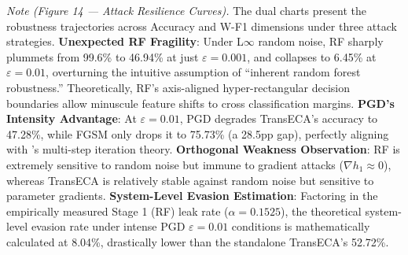 \documentclass[sigconf]{acmart}
\begin{document}
\begin{center}
\end{center}

\textit{Note (Figure 14 --- Attack Resilience Curves).} The dual charts present the robustness trajectories across Accuracy and W-F1 dimensions under three attack strategies. \textbf{Unexpected RF Fragility}: Under L$\infty$ random noise, RF sharply plummets from 99.6\% to 46.94\% at just $\varepsilon=0.001$, and collapses to 6.45\% at $\varepsilon=0.01$, overturning the intuitive assumption of ``inherent random forest robustness.'' Theoretically, RF's axis-aligned hyper-rectangular decision boundaries allow minuscule feature shifts to cross classification margins. \textbf{PGD's Intensity Advantage}: At $\varepsilon=0.01$, PGD degrades TransECA's accuracy to 47.28\%, while FGSM only drops it to 75.73\% (a 28.5pp gap), perfectly aligning with \cite{13}'s multi-step iteration theory. \textbf{Orthogonal Weakness Observation}: RF is extremely sensitive to random noise but immune to gradient attacks ($\nabla h_1 \approx 0$), whereas TransECA is relatively stable against random noise but sensitive to parameter gradients. \textbf{System-Level Evasion Estimation}: Factoring in the empirically measured Stage 1 (RF) leak rate ($\alpha=0.1525$), the theoretical system-level evasion rate under intense PGD $\varepsilon=0.01$ conditions is mathematically calculated at 8.04\%, drastically lower than the standalone TransECA's 52.72\%.

\begin{center}
\end{center}
\end{document}
